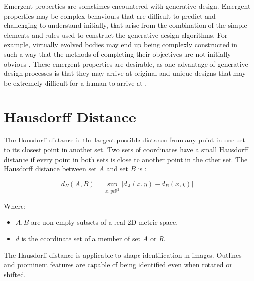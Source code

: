 Emergent properties are sometimes encountered with generative design. Emergent properties may be complex behaviours that are difficult to predict \citep{Aiguier2008} and challenging to understand initially, that arise from the combination of the simple elements and rules used to construct the generative design algorithms. For example, virtually evolved bodies may end up being complexly constructed in such a way that the methods of completing their objectives are not initially obvious \citep{Damper2000}. These emergent properties are desirable, as one advantage of generative design processes is that they may arrive at original and unique designs that may be extremely difficult for a human to arrive at \citep{Sims1994a}. 

\section{Hausdorff Distance}
\label{sec:HD}

The Hausdorff distance is the largest possible distance from any point in one set to its closest point in another set. Two sets of coordinates have a small Hausdorff distance if every point in both sets is close to another point in the other set. The Hausdorff distance between set $A$ and set $B$ is \citep{Tyrrell1997}:

\begin{equation}
	d_{H}\left ( A,B \right )= \underset{x,y\epsilon \mathbb{R}^{2}}{\sup}\left | d_{A}\left ( x,y \right )-d_{B}\left ( x,y \right ) \right |
\end{equation}

Where:

\begin{itemize}
	\item $A,B$ are non-empty subsets of a real 2D metric space.
	\item $d$ is the coordinate set of a member of set $A$ or $B$.
\end{itemize}

The Hausdorff distance is applicable to shape identification in images. Outlines and prominent features are capable of being identified even when rotated or shifted. \citep{Huttenlocher1993}